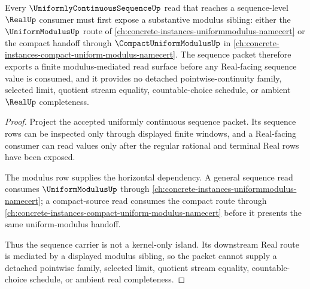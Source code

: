 \begin{theorem}
\label{thm:uniformly-continuous-sequence-orphan-route}
Every $\UniformlyContinuousSequenceUp$ read that reaches a sequence-level $\RealUp$ consumer must first expose a substantive modulus sibling: either the $\UniformModulusUp$ route of \autoref{ch:concrete-instances-uniformmodulus-namecert} or the compact handoff through $\CompactUniformModulusUp$ in \autoref{ch:concrete-instances-compact-uniform-modulus-namecert}. The sequence packet therefore exports a finite modulus-mediated read surface before any Real-facing sequence value is consumed, and it provides no detached pointwise-continuity family, selected limit, quotient stream equality, countable-choice schedule, or ambient $\RealUp$ completeness.
\end{theorem}
\begin{proof}
Project the accepted uniformly continuous sequence packet. Its sequence rows can be inspected only through displayed finite windows, and a Real-facing consumer can read values only after the regular rational and terminal Real rows have been exposed.

The modulus row supplies the horizontal dependency. A general sequence read consumes $\UniformModulusUp$ through \autoref{ch:concrete-instances-uniformmodulus-namecert}; a compact-source read consumes the compact route through \autoref{ch:concrete-instances-compact-uniform-modulus-namecert} before it presents the same uniform-modulus handoff.

Thus the sequence carrier is not a kernel-only island. Its downstream Real route is mediated by a displayed modulus sibling, so the packet cannot supply a detached pointwise family, selected limit, quotient stream equality, countable-choice schedule, or ambient real completeness.
\end{proof}
